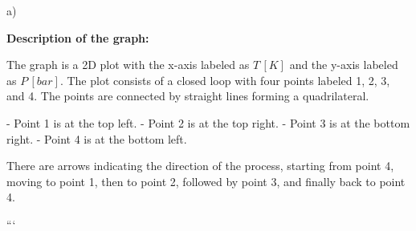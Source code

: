 a)

\textbf{Description of the graph:}

The graph is a 2D plot with the x-axis labeled as \( T \, [K] \) and the y-axis labeled as \( P \, [bar] \). The plot consists of a closed loop with four points labeled 1, 2, 3, and 4. The points are connected by straight lines forming a quadrilateral. 

- Point 1 is at the top left.
- Point 2 is at the top right.
- Point 3 is at the bottom right.
- Point 4 is at the bottom left.

There are arrows indicating the direction of the process, starting from point 4, moving to point 1, then to point 2, followed by point 3, and finally back to point 4.

```